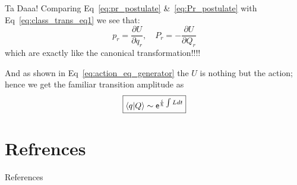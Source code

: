 \documentclass{beamer}
\newcommand{\inner}[2]{\left\langle#1|#2\right\rangle}
\renewcommand{\exp}[1]{\mathsf{e}^{#1}}
\begin{document}
\begin{frame}{Ta Daaa!}
    Comparing Eq~\ref{eq:pr_postulate}  \&~\ref{eq:Pr_postulate} with Eq~\ref{eq:class_trans_eq1}
    we see that:
    \begin{equation}
    \boxed{ p_r = \dfrac{\partial U}{\partial q_r}, \quad P_r = -\dfrac{\partial U}{\partial Q_r}}
    \end{equation}
    which are exactly like the canonical transformation!!!! 

    And as shown in Eq~\ref{eq:action_eq_generator} the \(U\) is nothing but the action; hence we get the familiar transition amplitude as
    \begin{equation}
        \boxed{\inner{q}{Q} \sim \exp{{i \over \hbar}\int L dt}} 
    \end{equation}
\end{frame}

\section{Refrences}
\begin{frame}{References}
\nocite{*}


\end{frame}

\end{document}
